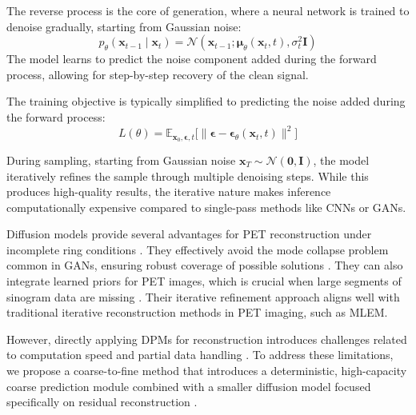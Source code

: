 \documentclass[
reprint,
superscriptaddress,
nofootinbib,
amsmath,amssymb,
aps,
prd,
]{revtex4-2}
\begin{document}
The reverse process is the core of generation, where a neural network is trained to denoise gradually, starting from Gaussian noise:
\begin{equation}
    p_\theta(\mathbf{x}_{t-1} \mid \mathbf{x}_t) = \mathcal{N}(\mathbf{x}_{t-1}; \boldsymbol{\mu}_\theta(\mathbf{x}_t, t), \sigma_t^2 \mathbf{I})
\end{equation}
The model learns to predict the noise component added during the forward process, allowing for step-by-step recovery of the clean signal.

The training objective is typically simplified to predicting the noise added during the forward process:
\begin{equation}
    L(\theta) = \mathbb{E}_{\mathbf{x}_0, \boldsymbol{\epsilon}, t}\bigl[\|\boldsymbol{\epsilon} - \boldsymbol{\epsilon}_\theta(\mathbf{x}_t, t)\|^2\bigr]
\end{equation}

During sampling, starting from Gaussian noise $\mathbf{x}_T \sim \mathcal{N}(\mathbf{0}, \mathbf{I})$, the model iteratively refines the sample through multiple denoising steps. While this produces high-quality results, the iterative nature makes inference computationally expensive compared to single-pass methods like CNNs or GANs.

Diffusion models provide several advantages for PET reconstruction under incomplete ring conditions \cite{webber2024}. They effectively avoid the mode collapse problem common in GANs, ensuring robust coverage of possible solutions \cite{singh2024}. They can also integrate learned priors for PET images, which is crucial when large segments of sinogram data are missing \cite{gong2024}. Their iterative refinement approach aligns well with traditional iterative reconstruction methods in PET imaging, such as MLEM.

However, directly applying DPMs for reconstruction introduces challenges related to computation speed and partial data handling \cite{liu2019}. To address these limitations, we propose a coarse-to-fine method that introduces a deterministic, high-capacity coarse prediction module combined with a smaller diffusion model focused specifically on residual reconstruction \cite{han2023}.
\end{document}
